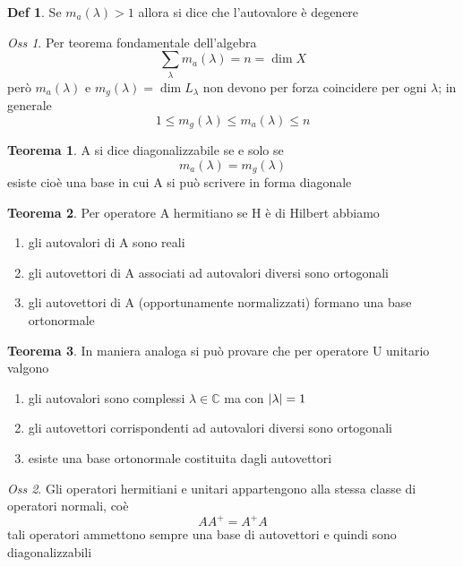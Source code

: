 \documentclass[a4paper,11pt]{report}
\theoremstyle{remark}
\newtheorem*{oss}{Oss}
\theoremstyle{definition}
\newtheorem*{teo}{Teorema}
\newtheorem*{Def}{Def}
\newcommand{\C}{\mathbb{C}}
\DeclarePairedDelimiter{\abs}{\lvert}{\rvert}
\begin{document}
\begin{Def}
	Se $m_a(\lambda)> 1$ allora si dice che l'autovalore è degenere
\end{Def}

\begin{oss}
	Per teorema fondamentale dell'algebra
	\begin{equation*}
		\sum_{\lambda} m_a(\lambda)=n=\dim{X}
	\end{equation*}
	però $m_a(\lambda)$ e $m_g(\lambda)=\dim{L_\lambda}$ non devono per forza coincidere  per ogni $\lambda$; in generale 
	\begin{equation*}
		1 \le m_g(\lambda) \le m_a(\lambda) \le n 
	\end{equation*}
\end{oss}

\begin{teo}
	A si dice diagonalizzabile se e solo se 
	\begin{equation*}
		m_a(\lambda) = m_g(\lambda)
	\end{equation*}
	esiste cioè una base in cui A si può scrivere in forma diagonale
\end{teo}

\begin{teo}
	Per operatore A hermitiano se H è di Hilbert abbiamo
	\begin{enumerate}
		\item gli autovalori di A sono reali
  \item gli autovettori di A associati ad autovalori diversi sono ortogonali
  \item gli autovettori di A (opportunamente normalizzati) formano una base ortonormale
	\end{enumerate}
\end{teo}

\begin{teo}
	In maniera analoga si può provare che per operatore U unitario valgono
	\begin{enumerate}
		\item gli autovalori sono complessi $\lambda \in \C $ ma con $\abs{\lambda} =1$
  \item gli autovettori corrispondenti ad autovalori diversi sono ortogonali
  \item esiste una base ortonormale costituita dagli autovettori
	\end{enumerate}
\end{teo}

\begin{oss}
	Gli operatori hermitiani e unitari appartengono alla stessa classe di operatori normali, coè
	\begin{equation*}
		AA^+ = A^+A
	\end{equation*}
	tali operatori ammettono sempre una base di autovettori e quindi sono diagonalizzabili
\end{oss}
\end{document}
